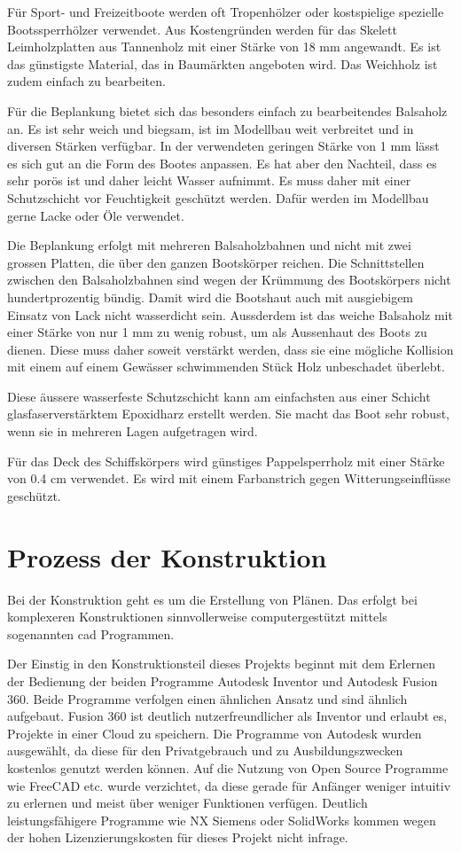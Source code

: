 Für Sport- und Freizeitboote werden oft Tropenhölzer oder kostspielige spezielle Bootssperrhölzer verwendet. Aus Kostengründen werden für das Skelett Leimholzplatten aus Tannenholz mit einer Stärke von 18 mm angewandt. Es ist das günstigste Material, das in Baumärkten angeboten wird. Das Weichholz ist zudem einfach zu bearbeiten.

Für die Beplankung bietet sich das besonders einfach zu bearbeitendes Balsaholz an. Es ist sehr weich und biegsam, ist im Modellbau weit verbreitet und in diversen Stärken verfügbar. In der verwendeten geringen Stärke von 1 mm lässt es sich gut an die Form des Bootes anpassen. Es hat aber den Nachteil, dass es sehr porös ist und daher leicht Wasser aufnimmt. Es muss daher mit einer Schutzschicht vor Feuchtigkeit geschützt werden. Dafür werden im Modellbau gerne Lacke oder Öle verwendet.

Die Beplankung erfolgt mit mehreren Balsaholzbahnen und nicht mit zwei grossen Platten, die über den ganzen Bootskörper reichen. Die Schnittstellen zwischen den Balsaholzbahnen sind wegen der Krümmung des Bootskörpers nicht hundertprozentig bündig. Damit wird die Bootshaut auch mit ausgiebigem Einsatz von Lack nicht wasserdicht sein. Aussderdem ist das weiche Balsaholz mit einer Stärke von nur 1 mm zu wenig robust, um als Aussenhaut des Boots zu dienen. Diese muss daher soweit verstärkt werden, dass sie eine mögliche Kollision mit einem auf einem Gewässer schwimmenden Stück Holz unbeschadet überlebt.

Diese äussere wasserfeste Schutzschicht kann am einfachsten aus einer Schicht glasfaserverstärktem Epoxidharz erstellt werden. Sie macht das Boot sehr robust, wenn sie in mehreren Lagen aufgetragen wird.

Für das Deck des Schiffskörpers wird günstiges Pappelsperrholz mit einer Stärke von 0.4 cm verwendet. Es wird mit einem Farbanstrich gegen Witterungseinflüsse geschützt.

\section{Prozess der Konstruktion}
Bei der Konstruktion geht es um die Erstellung von Plänen. Das erfolgt bei komplexeren Konstruktionen sinnvollerweise computergestützt mittels sogenannten \ac{cad} Programmen. 

Der Einstig in den Konstruktionsteil dieses Projekts beginnt mit dem Erlernen der Bedienung der beiden Programme Autodesk Inventor und Autodesk Fusion 360. Beide Programme verfolgen einen ähnlichen Ansatz und sind ähnlich aufgebaut. Fusion 360 ist deutlich nutzerfreundlicher als Inventor und erlaubt es, Projekte in einer Cloud zu speichern. Die Programme von Autodesk wurden ausgewählt, da diese für den Privatgebrauch und zu Ausbildungszwecken kostenlos genutzt werden können. Auf die Nutzung von Open Source Programme wie FreeCAD etc. wurde verzichtet, da diese gerade für Anfänger weniger intuitiv zu erlernen und meist über weniger Funktionen verfügen. Deutlich leistungsfähigere Programme wie NX Siemens oder SolidWorks kommen wegen der hohen Lizenzierungskosten für dieses Projekt nicht infrage. 

